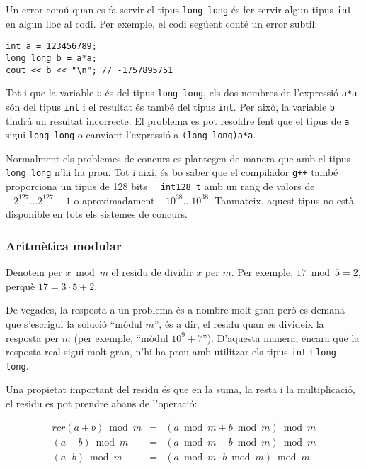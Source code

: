 Un error comú quan es fa servir el tipus \texttt{long long}
és fer servir algun tipus \texttt{int} en algun lloc
al codi.
Per exemple, el codi següent conté
un error subtil:

\begin{lstlisting}
int a = 123456789;
long long b = a*a;
cout << b << "\n"; // -1757895751
\end{lstlisting}

Tot i que la variable \texttt{b} és del tipus \texttt{long long},
els dos nombres de l'expressió \texttt{a*a}
són del tipus \texttt{int} i el resultat és
també del tipus \texttt{int}.
Per això, la variable \texttt{b} tindrà
un resultat incorrecte.
El problema es pot resoldre fent que el tipus
de \texttt{a} sigui \texttt{long long} o
canviant l'expressió a \texttt{(long long)a*a}.

Normalment els problemes de concurs es plantegen de manera que
amb el tipus \texttt{long long} n'hi ha prou.
Tot i així, és bo saber que el compilador \texttt{g++} també proporciona
un tipus de 128 bits \texttt{\_\_int128\_t}
amb un rang de valors de
$-2^{127} \ldots 2^{127}-1$ o aproximadament $-10^{38} \ldots 10^{38}$.
Tanmateix, aquest tipus no està disponible en tots els sistemes de concurs.

\subsubsection{Aritmètica modular}


Denotem per $x \bmod m$ el residu
de dividir $x$ per $m$.
Per exemple, $17 \bmod 5 = 2$,
perquè $17 = 3 \cdot 5 + 2$.

De vegades, la resposta a un problema és a
nombre molt gran però es demana que s'escrigui
la solució ``mòdul $m$'', és a dir,
el residu quan es divideix la resposta per $m$
(per exemple, ``mòdul $10^9+7$'').
D'aquesta manera, encara que la resposta real
sigui molt gran,
n'hi ha prou amb utilitzar els tipus
\texttt{int} i \texttt{long long}.

Una propietat important del residu és que
en la suma, la resta i la multiplicació,
el residu es pot prendre abans de l'operació:

\[
\begin{matrix}{rcr}
(a+b) \bmod m & = & (a \bmod m + b \bmod m) \bmod m \\
(a-b) \bmod m & = & (a \bmod m - b \bmod m) \bmod m \\
(a \cdot b) \bmod m & = & (a \bmod m \cdot b \bmod m) \bmod m
\end{matrix}
\]

